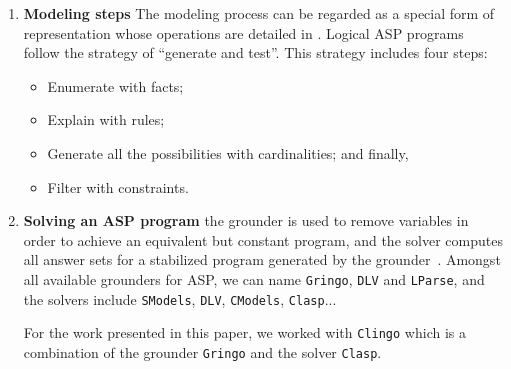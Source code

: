\begin{enumerate}
\item\textbf{Modeling steps}
The modeling process can be regarded as a special form of representation whose operations are detailed in \cite{baral2003knowledge}.
Logical ASP programs follow the strategy of “generate and test”.
This strategy includes four steps:
\begin{itemize}
\item Enumerate with facts;
\item Explain with rules;
\item Generate all the possibilities with cardinalities; and finally,
\item Filter with constraints.
\end{itemize}

\item \textbf{Solving an ASP program}
%
the grounder is used to remove variables in order to achieve an equivalent but constant program,
and the solver computes all answer sets for a stabilized program generated by the grounder~\cite{Vladimir,AnsPrologAPE}.
Amongst all available grounders for ASP, we can name
\texttt{Gringo}, \texttt{DLV} and \texttt{LParse},
and the solvers include
\texttt{SModels}, \texttt{DLV}, \texttt{CModels}, \texttt{Clasp}...

For the work presented in this paper, we worked with \texttt{Clingo} which is a combination of the grounder \texttt{Gringo} and the solver \texttt{Clasp}.

\end{enumerate}


